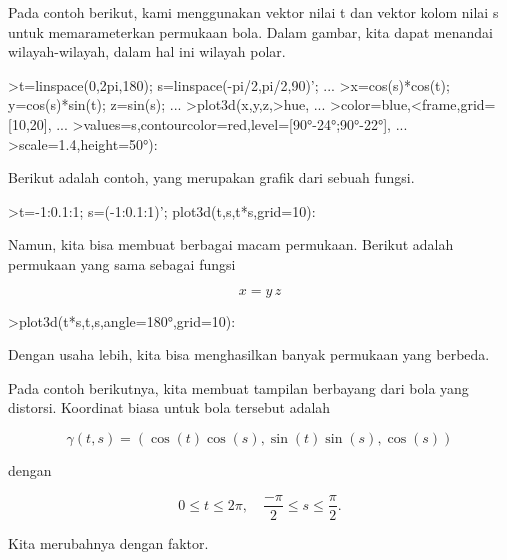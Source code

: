 \documentclass[a4paper,10pt]{article}
\begin{document}
\begin{eulernotebook}
\begin{eulercomment}
\begin{eulercomment}
\begin{eulercomment}
Pada contoh berikut, kami menggunakan vektor nilai t dan vektor kolom
nilai s untuk memarameterkan permukaan bola. Dalam gambar, kita dapat
menandai wilayah-wilayah, dalam hal ini wilayah polar.
\end{eulercomment}
\begin{eulerprompt}
>t=linspace(0,2pi,180); s=linspace(-pi/2,pi/2,90)'; ...
>x=cos(s)*cos(t); y=cos(s)*sin(t); z=sin(s); ...
>plot3d(x,y,z,>hue, ...
>color=blue,<frame,grid=[10,20], ...
>values=s,contourcolor=red,level=[90°-24°;90°-22°], ...
>scale=1.4,height=50°):
\end{eulerprompt}
\begin{eulercomment}
Berikut adalah contoh, yang merupakan grafik dari sebuah fungsi.
\end{eulercomment}
\begin{eulerprompt}
>t=-1:0.1:1; s=(-1:0.1:1)'; plot3d(t,s,t*s,grid=10):
\end{eulerprompt}
\begin{eulercomment}
Namun, kita bisa membuat berbagai macam permukaan. Berikut adalah
permukaan yang sama sebagai fungsi

\end{eulercomment}
\begin{eulerformula}
\[
x = y \, z
\]
\end{eulerformula}
\begin{eulerprompt}
>plot3d(t*s,t,s,angle=180°,grid=10):
\end{eulerprompt}
\begin{eulercomment}
Dengan usaha lebih, kita bisa menghasilkan banyak permukaan yang
berbeda.

Pada contoh berikutnya, kita membuat tampilan berbayang dari bola yang
distorsi. Koordinat biasa untuk bola tersebut adalah

\end{eulercomment}
\begin{eulerformula}
\[
\gamma(t,s) = (\cos(t)\cos(s),\sin(t)\sin(s),\cos(s))
\]
\end{eulerformula}
\begin{eulercomment}
dengan

\end{eulercomment}
\begin{eulerformula}
\[
0 \le t \le 2\pi, \quad \frac{-\pi}{2} \le s \le \frac{\pi}{2}.
\]
\end{eulerformula}
\begin{eulercomment}
Kita merubahnya dengan faktor.


\end{eulercomment}
\end{eulercomment}
\end{eulercomment}
\end{eulernotebook}
\end{document}
